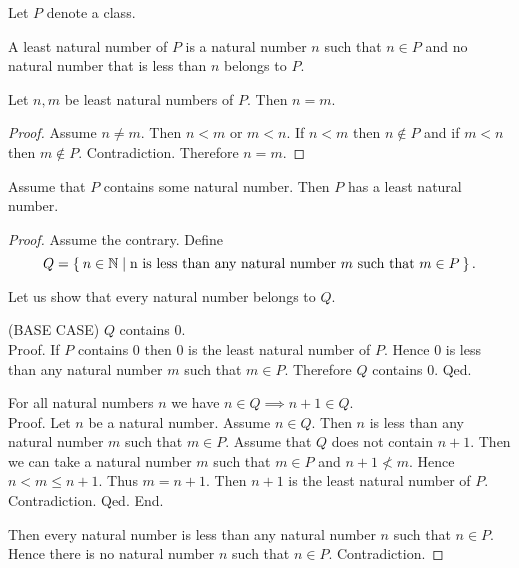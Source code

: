 \documentclass[../../natural-numbers.ftl.tex]{subfiles}
\begin{document}
  \begin{forthel}
    Let $P$ denote a class.

    \begin{definition}
      A least natural number of $P$ is a natural number $n$ such that $n \in P$ and no natural number that is less than $n$ belongs to $P$.
    \end{definition}

    \begin{lemma}
      Let $n,m$ be least natural numbers of $P$.
      Then $n = m$.
    \end{lemma}
    \begin{proof}
      Assume $n \neq m$.
      Then $n < m$ or $m < n$.
      If $n < m$ then $n \notin P$ and if $m < n$ then $m \notin P$.
      Contradiction.
      Therefore $n = m$.
    \end{proof}


    \begin{theorem}[NN 02 05 124228]
      Assume that $P$ contains some natural number.
      Then $P$ has a least natural number.
    \end{theorem}
    \begin{proof}
      Assume the contrary.
      Define \[ Q = \Set{n \in \mathbb{N} | \text{n is less than any natural number $m$ such that $m \in P$}}. \]

      Let us show that every natural number belongs to $Q$.

        (BASE CASE) $Q$ contains $0$. \\
        Proof.
          If $P$ contains $0$ then $0$ is the least natural number of $P$.
          Hence $0$ is less than any natural number $m$ such that $m \in P$.
          Therefore $Q$ contains $0$.
        Qed.

        For all natural numbers $n$ we have $n \in Q \implies n + 1 \in Q$. \\
        Proof.
          Let $n$ be a natural number.
          Assume $n \in Q$.
          Then $n$ is less than any natural number $m$ such that $m \in P$.
          Assume that $Q$ does not contain $n + 1$.
          Then we can take a natural number $m$ such that $m \in P$ and $n + 1 \nless m$.
          Hence $n < m \leq n + 1$.
          Thus $m = n + 1$.
          Then $n + 1$ is the least natural number of $P$.
          Contradiction.
        Qed.
      End.

      Then every natural number is less than any natural number $n$ such that $n \in P$.
      Hence there is no natural number $n$ such that $n \in P$.
      Contradiction.
    \end{proof}
  \end{forthel}
\end{document}

